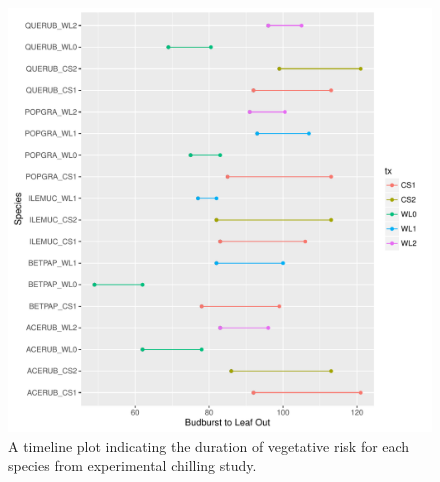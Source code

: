 \documentclass{article}\usepackage[]{graphicx}\usepackage[]{color}
\makeatletter
\def\maxwidth{ %
  \ifdim\Gin@nat@width>\linewidth
    \linewidth
  \else
    \Gin@nat@width
  \fi
}
\makeatother
\begin{document}
\begin{figure}[H]
\includegraphics[width=\maxwidth]{figure/chilling-1} \caption[A timeline plot indicating the duration of vegetative risk for each species from experimental chilling study]{A timeline plot indicating the duration of vegetative risk for each species from experimental chilling study.}\label{fig:chilling}
\end{figure}
\end{document}
